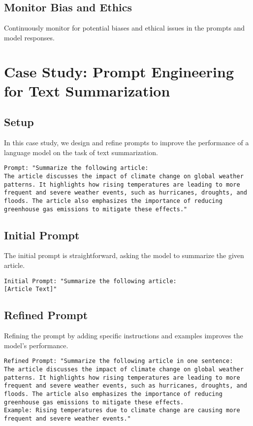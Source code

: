 \subsection{Monitor Bias and Ethics}
Continuously monitor for potential biases and ethical issues in the prompts and model responses.

\section{Case Study: Prompt Engineering for Text Summarization}

\subsection{Setup}
In this case study, we design and refine prompts to improve the performance of a language model on the task of text summarization.

\begin{verbatim}
Prompt: "Summarize the following article:
The article discusses the impact of climate change on global weather patterns. It highlights how rising temperatures are leading to more frequent and severe weather events, such as hurricanes, droughts, and floods. The article also emphasizes the importance of reducing greenhouse gas emissions to mitigate these effects."
\end{verbatim}

\subsection{Initial Prompt}
The initial prompt is straightforward, asking the model to summarize the given article.

\begin{verbatim}
Initial Prompt: "Summarize the following article:
[Article Text]"
\end{verbatim}

\subsection{Refined Prompt}
Refining the prompt by adding specific instructions and examples improves the model's performance.

\begin{verbatim}
Refined Prompt: "Summarize the following article in one sentence:
The article discusses the impact of climate change on global weather patterns. It highlights how rising temperatures are leading to more frequent and severe weather events, such as hurricanes, droughts, and floods. The article also emphasizes the importance of reducing greenhouse gas emissions to mitigate these effects.
Example: Rising temperatures due to climate change are causing more frequent and severe weather events."
\end{verbatim}

